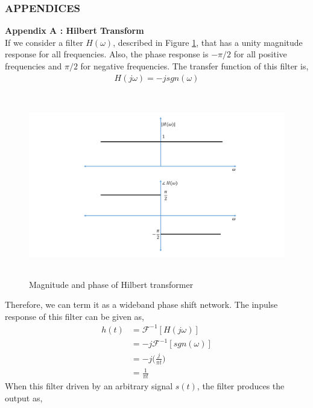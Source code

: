 \subsubsection{\textbf{APPENDICES}}
\textbf{Appendix A : Hilbert Transform}\\
If we consider a filter $H(\omega)$, described in Figure \ref{Hilbert_Transformer}, that has a unity magnitude response for all frequencies. Also, the phase response is $-\pi/2$ for all positive frequencies and $\pi/2$ for negative frequencies. The transfer function of this filter is,
\begin{equation}
\begin{split}
H(j\omega)=-jsgn(\omega)
\end{split}
\label{}
\end{equation}
\begin{figure}[h]
	\centering
	\includegraphics[width=1.0\textwidth, height=8cm]{./sdf/simplified_coherent_receiver/figures/HT.pdf}
	\caption{Magnitude and phase of Hilbert transformer}\label{Hilbert_Transformer}
\end{figure}
Therefore, we can term it as a wideband phase shift network. The inpulse response of this filter can be given as,
\begin{equation}
\begin{split}
h(t)&=\mathcal{F}^{-1}[H(j\omega)]\\
	&=-j\mathcal{F}^{-1}[sgn(\omega)]\\
	&=-j\bigg(\frac{j}{\pi t}\bigg)\\
	&=\frac{1}{\pi t}
\end{split}
\label{}
\end{equation}
When this filter driven by an arbitrary signal $s(t)$, the filter produces the output as,

